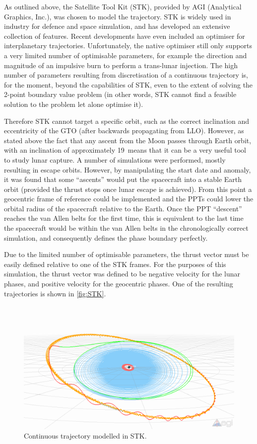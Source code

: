 As outlined above, the Satellite Tool Kit (STK), provided by AGI (Analytical Graphics, Inc.), was chosen to model the trajectory. STK is widely used in industry for defence and space simulation, and has developed an extensive collection of features. Recent developments have even included an optimiser for interplanetary trajectories. Unfortunately, the native optimiser still only supports a very limited number of optimisable parameters, for example the direction and magnitude of an impulsive burn to perform a trans-lunar injection. The high number of parameters resulting from discretisation of a continuous trajectory is, for the moment, beyond the capabilities of STK, even to the extent of solving the 2-point boundary value problem (in other words, STK cannot find a feasible solution to the problem let alone optimise it).

Therefore STK cannot target a specific orbit, such as the correct inclination and eccentricity of the GTO (after backwards propagating from LLO). However, as stated above the fact that any ascent from the Moon passes through Earth orbit, with an inclination of approximately 19\degrees\ means that it can be a very useful tool to study lunar capture. A number of simulations were performed, mostly resulting in escape orbits. However, by manipulating the start date and anomaly, it was found that some \enquote{ascents} would put the spacecraft into a stable Earth orbit (provided the thrust stops once lunar escape is achieved). From this point a geocentric frame of reference could be implemented and the PPTs could lower the orbital radius of the spacecraft relative to the Earth. Once the PPT \enquote{descent} reaches the van Allen belts for the first time, this is equivalent to the last time the spacecraft would be within the van Allen belts in the chronologically correct simulation, and consequently defines the phase boundary perfectly.

Due to the limited number of optimisable parameters, the thrust vector must be easily defined relative to one of the STK frames. For the purposes of this simulation, the thrust vector was defined to be negative velocity for the lunar phases, and positive velocity for the geocentric phases. One of the resulting trajectories is shown in \autoref{fig:STK}.

\begin{figure}
\centering
\includegraphics[width=\textwidth]{Images/STK/trajectory_white.png}
\caption{Continuous trajectory modelled in STK.} \label{fig:STK}
\end{figure}

